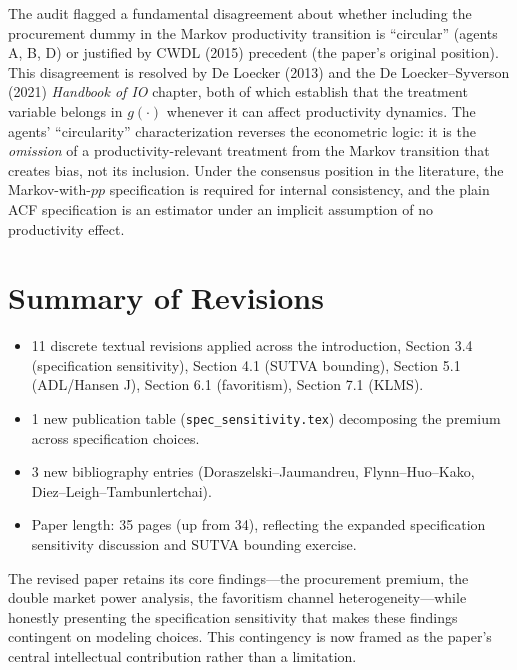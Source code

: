 \documentclass[11pt]{article}
\begin{document}
The audit flagged a fundamental disagreement about whether including the procurement dummy in the Markov productivity transition is ``circular'' (agents A, B, D) or justified by CWDL (2015) precedent (the paper's original position). This disagreement is resolved by De Loecker (2013) and the De Loecker--Syverson (2021) \emph{Handbook of IO} chapter, both of which establish that the treatment variable belongs in $g(\cdot)$ whenever it can affect productivity dynamics. The agents' ``circularity'' characterization reverses the econometric logic: it is the \emph{omission} of a productivity-relevant treatment from the Markov transition that creates bias, not its inclusion. Under the consensus position in the literature, the Markov-with-$pp$ specification is required for internal consistency, and the plain ACF specification is an estimator under an implicit assumption of no productivity effect.

\section{Summary of Revisions}

\begin{itemize}
\item 11 discrete textual revisions applied across the introduction, Section 3.4 (specification sensitivity), Section 4.1 (SUTVA bounding), Section 5.1 (ADL/Hansen J), Section 6.1 (favoritism), Section 7.1 (KLMS).
\item 1 new publication table (\texttt{spec\_sensitivity.tex}) decomposing the premium across specification choices.
\item 3 new bibliography entries (Doraszelski--Jaumandreu, Flynn--Huo--Kako, Diez--Leigh--Tambunlertchai).
\item Paper length: 35 pages (up from 34), reflecting the expanded specification sensitivity discussion and SUTVA bounding exercise.
\end{itemize}

\noindent The revised paper retains its core findings---the procurement premium, the double market power analysis, the favoritism channel heterogeneity---while honestly presenting the specification sensitivity that makes these findings contingent on modeling choices. This contingency is now framed as the paper's central intellectual contribution rather than a limitation.
\end{document}
